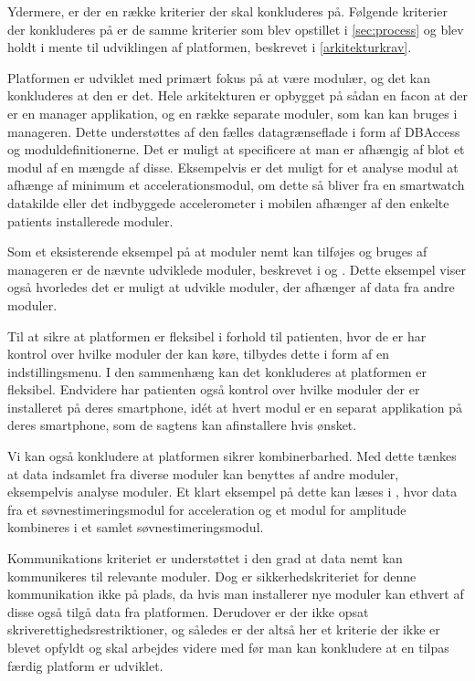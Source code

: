 Ydermere, er der en række kriterier der skal konkluderes på.
Følgende kriterier der konkluderes på er de samme kriterier som blev opstillet i \cref{sec:process} og blev holdt i mente til udviklingen af platformen, beskrevet i \cref{arkitekturkrav}.
\begin{description}[style=nextline]
	\item[Modulær]
	Platformen er udviklet med primært fokus på at være modulær, og det kan konkluderes at den er det.
	Hele arkitekturen er opbygget på sådan en facon at der er en manager applikation, og en række separate moduler, som kan kan bruges i manageren.
	Dette understøttes af den fælles datagrænseflade i form af DBAccess og moduldefinitionerne.  
	Det er muligt at specificere at man er afhængig af blot et modul af en mængde af disse.
	Eksempelvis er det muligt for et analyse modul at afhænge af minimum et accelerationsmodul, om dette så bliver fra en smartwatch datakilde eller det indbyggede accelerometer i mobilen afhænger af den enkelte patients installerede moduler.
	
	Som et eksisterende eksempel på at moduler nemt kan tilføjes og bruges af manageren er de nævnte udviklede moduler, beskrevet i \citet{misc:soevnrapp} og \citet{misc:surveyrapp}.
	Dette eksempel viser også hvorledes det er muligt at udvikle moduler, der afhænger af data fra andre moduler.
	
	\item[Fleksibilitet]
	Til at sikre at platformen er fleksibel i forhold til patienten, hvor de er har kontrol over hvilke moduler der kan køre, tilbydes dette i form af en indstillingsmenu.
	I den sammenhæng kan det konkluderes at platformen er fleksibel.
	Endvidere har patienten også kontrol over hvilke moduler der er installeret på deres smartphone, idét at hvert modul er en separat applikation på deres smartphone, som de sagtens kan afinstallere hvis ønsket.
	
	\item[Kombinerbar]
	Vi kan også konkludere at platformen sikrer kombinerbarhed.
	Med dette tænkes at data indsamlet fra diverse moduler kan benyttes af andre moduler, eksempelvis analyse moduler.
	Et klart eksempel på dette kan læses i \citet{misc:soevnrapp}, hvor data fra et søvnestimeringsmodul for acceleration og et modul for amplitude kombineres i et samlet søvnestimeringsmodul.
	
	\item[Kommunikation]
	Kommunikations kriteriet er understøttet i den grad at data nemt kan kommunikeres til relevante moduler.
	Dog er sikkerhedskriteriet for denne kommunikation ikke på plads, da hvis man installerer nye moduler kan ethvert af disse også tilgå data fra platformen.
	Derudover er der ikke opsat skriverettighedsrestriktioner, og således er der altså her et kriterie der ikke er blevet opfyldt og skal arbejdes videre med før man kan konkludere at en tilpas færdig platform er udviklet.
\end{description}


